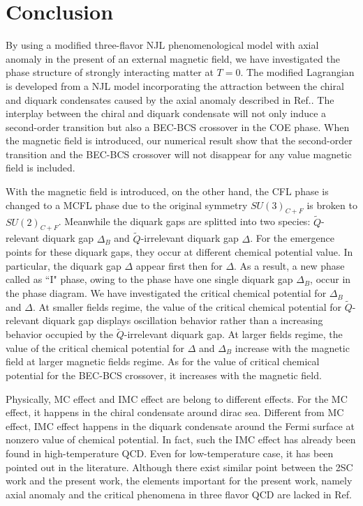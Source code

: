 \documentclass[prd, showpacs,nofootinbib,amsmath,amssymb]{revtex4}
\begin{document}
\section{Conclusion}
By using a modified three-flavor NJL phenomenological model with
axial anomaly in the present of an external magnetic field,
we have investigated the phase structure of strongly interacting matter at $T=0$.
The modified Lagrangian is developed from a NJL model
incorporating the attraction between the chiral and diquark condensates caused by
the axial anomaly
described in Ref.\cite{abuki2010nambu}.
The interplay between the chiral and diquark condensate will not only induce a
second-order transition but also a BEC-BCS crossover in the COE phase.
When the magnetic field is introduced,
our numerical result show that the second-order transition and the BEC-BCS crossover will not  disappear
for  any value magnetic field is included.

With the magnetic field is introduced, on the other hand, the CFL phase is changed to a MCFL phase
due to the original symmetry $SU(3)_{C+F}$ is broken to $SU(2)_{C+F}$.
Meanwhile the diquark gaps are splitted into two species:
$\widetilde{Q}$-relevant diquark gap $\Delta_B$ and  $\widetilde{Q}$-irrelevant diquark gap $\Delta$.
For the emergence points for these
diquark gaps, they occur at different chemical potential value.
In particular, the diquark gap $\Delta$ appear first then for $\Delta$.
As a result, a new phase called as ``I" phase,
owing to the phase have one single diquark gap $\Delta_B$, occur in the phase diagram.
We have investigated
the critical  chemical potential for $\Delta_B$ and $\Delta$.
At smaller fields regime, the value of the critical chemical potential for
$\widetilde{Q}$-relevant diquark gap displays oscillation behavior rather than
a increasing behavior occupied by the $\widetilde{Q}$-irrelevant diquark gap.
At larger fields regime, the value of the critical chemical potential for
$\Delta$ and $\Delta_B$
increase with the magnetic field at larger  magnetic fields regime.
As for the value of critical chemical potential for the BEC-BCS crossover, it increases with the magnetic field.

Physically, MC effect  and IMC effect  are  belong to different effects.
For the MC effect, it happens in the chiral condensate  around dirac sea.
Different from MC effect, IMC effect happens in the diquark condensate around the
Fermi surface at nonzero value of chemical potential.
In fact, such the IMC effect has already been found in high-temperature QCD.
Even for low-temperature case, it has been pointed out in the literature.
Although there exist similar point  between the 2SC work and the present work,
the elements important for the present work, namely axial anomaly and the critical phenomena in three flavor QCD
are lacked in Ref.\cite{2sc}
\end{document}
